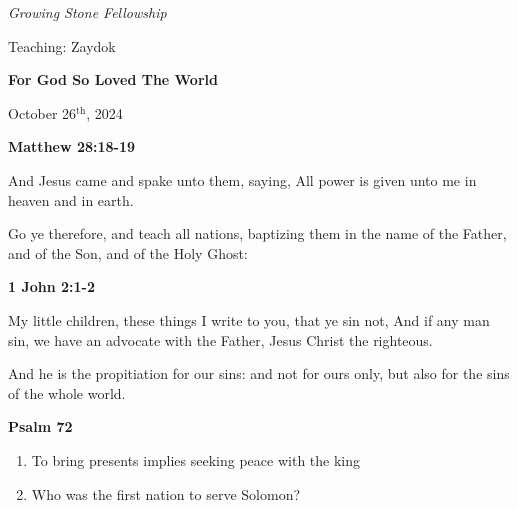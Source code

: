 \documentclass[dark]{gsf-presentation}
\begin{document}
\begin{frame}[plain]
	\begin{center}
		\textit{\Large Growing Stone Fellowship}

		\Large
		Teaching: Zaydok

		\vspace{5mm}
		\textbf{\Huge For God So Loved The World}

		\vspace{5mm}
		\large
		October 26$^{\text{th}}$, 2024
	\end{center}
\end{frame}

\begin{frame}[plain]{\textbf{\textcolor{SecondColor}{\LARGE Matthew 28:18-19}}}
	\LARGE
	\begin{center}
		And Jesus came and spake unto them, saying,
		All power is given unto me in heaven and in
		earth.

		\vspace{2mm}
		Go ye therefore, and teach all nations, baptizing
		them in the name of the Father, and of the Son, and 
		of the Holy Ghost:
	\end{center}
\end{frame}

\begin{frame}
	
\end{frame}

\begin{frame}[plain]{\textbf{\textcolor{SecondColor}{\LARGE 1 John 2:1-2}}}
	\LARGE
	\begin{center}
		My little children, these things I write to you,
		that ye sin not, And if any man sin, we have an
		advocate with the Father, Jesus Christ the
		righteous.

		\vspace{2mm}
		And he is the propitiation for our sins: and not
		for ours only, but also for the sins of the whole
		world.
	\end{center}
\end{frame}

\begin{frame}[plain]{\textbf{\textcolor{SecondColor}{\LARGE Psalm 72}}}
	\LARGE
	\begin{center}
			
	\end{center}
\end{frame}

\begin{frame}
	\LARGE
	\begin{enumerate}
		\item To bring presents implies seeking peace with the king
		\item Who was the first nation to serve Solomon?
	\end{enumerate}
\end{frame}
\end{document}
